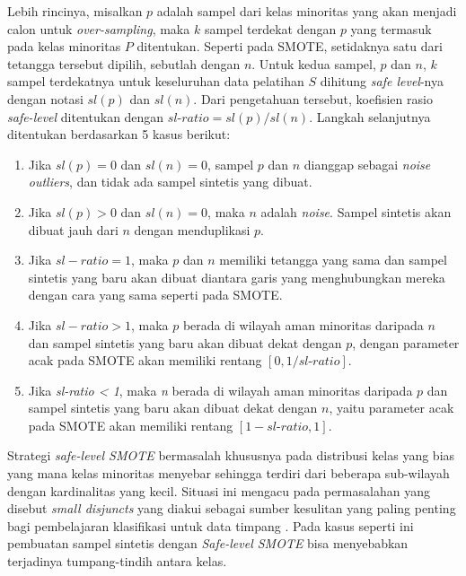 Lebih rincinya, misalkan $ p $ adalah sampel dari kelas minoritas yang akan
menjadi calon untuk \textit{over-sampling}, maka $ k $ sampel terdekat dengan
$ p $ yang termasuk pada kelas minoritas $ P $ ditentukan.
Seperti pada SMOTE, setidaknya satu dari tetangga tersebut dipilih, sebutlah
dengan $ n $.
Untuk kedua sampel, $ p $ dan $ n $, $ k $ sampel terdekatnya untuk keseluruhan
data pelatihan $ S $ dihitung \textit{safe level}-nya dengan notasi $ sl(p) $
dan $ sl(n) $.
Dari pengetahuan tersebut, koefisien rasio \textit{safe-level} ditentukan
dengan $ \textit{sl-ratio} = sl(p) / sl(n) $.
Langkah selanjutnya ditentukan berdasarkan 5 kasus berikut:
\begin{enumerate}
	\item \label{case:safe-1} Jika $ sl(p) = 0 $ dan $ sl(n) = 0 $, sampel
	$ p $ dan $ n $ dianggap sebagai \textit{noise outliers}, dan tidak ada
	sampel sintetis yang dibuat.
	\item Jika $ sl(p) > 0 $ dan $ sl(n) = 0 $, maka $ n $
	adalah \textit{noise}.
	Sampel sintetis akan dibuat jauh dari $ n $ dengan menduplikasi $ p $.
	\item Jika $ sl-ratio = 1 $, maka $ p $ dan $ n $ memiliki tetangga
	yang sama dan sampel sintetis yang baru akan dibuat diantara garis yang
	menghubungkan mereka dengan cara yang sama seperti pada SMOTE.
	\item Jika $ sl-ratio > 1 $, maka $ p $ berada di wilayah
	aman minoritas daripada $ n $ dan sampel sintetis yang baru akan
	dibuat dekat dengan $ p $, dengan parameter acak pada SMOTE akan
	memiliki rentang $ [0, 1 / \textit{sl-ratio}] $.
	\item Jika \textit{sl-ratio < 1}, maka \textit{n} berada di wilayah
	aman minoritas daripada $ p $ dan sampel sintetis yang baru akan
	dibuat dekat dengan $ n $, yaitu parameter acak pada SMOTE akan
	memiliki rentang $ [1 - \textit{sl-ratio}, 1] $.
\end{enumerate}

Strategi \textit{safe-level SMOTE} bermasalah khususnya pada distribusi kelas
yang bias yang mana kelas minoritas menyebar sehingga terdiri dari beberapa
sub-wilayah dengan kardinalitas yang kecil.
Situasi ini mengacu pada permasalahan yang disebut \textit{small disjuncts}
yang diakui sebagai sumber kesulitan yang paling penting bagi pembelajaran
klasifikasi untuk data timpang \cite{jo2004class}.
Pada kasus seperti ini pembuatan sampel sintetis dengan \textit{Safe-level
SMOTE} bisa menyebabkan terjadinya tumpang-tindih antara kelas.

